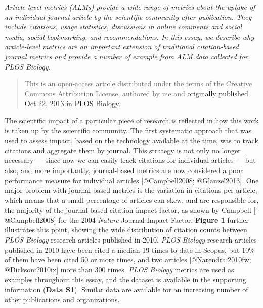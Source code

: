\emph{Article-level metrics (ALMs) provide a wide range of metrics about
the uptake of an individual journal article by the scientific community
after publication. They include citations, usage statistics, discussions
in online comments and social media, social bookmarking, and
recommendations. In this essay, we describe why article-level metrics
are an important extension of traditional citation-based journal metrics
and provide a number of example from ALM data collected for PLOS
Biology.}

\begin{quote}
This is an open-access article distributed under the terms of the
Creative Commons Attribution License, authored by me and
\href{http://dx.doi.org/10.1371/journal.pbio.1001687}{originally
published Oct 22, 2013 in PLOS Biology}.
\end{quote}

The scientific impact of a particular piece of research is reflected in
how this work is taken up by the scientific community. The first
systematic approach that was used to assess impact, based on the
technology available at the time, was to track citations and aggregate
them by journal. This strategy is not only no longer necessary --- since
now we can easily track citations for individual articles --- but also,
and more importantly, journal-based metrics are now considered a poor
performance measure for individual articles {[}@Campbell2008;
@Glanzel2013{]}. One major problem with journal-based metrics is the
variation in citations per article, which means that a small percentage
of articles can skew, and are responsible for, the majority of the
journal-based citation impact factor, as shown by Campbell
{[}-@Campbell2008{]} for the 2004 \emph{Nature} Journal Impact Factor.
\textbf{Figure 1} further illustrates this point, showing the wide
distribution of citation counts between \emph{PLOS Biology} research
articles published in 2010. \emph{PLOS Biology} research articles
published in 2010 have been cited a median 19 times to date in Scopus,
but 10\% of them have been cited 50 or more times, and two articles
{[}@Narendra:2010fw; @Dickson:2010ix{]} more than 300 times. \emph{PLOS
Biology} metrics are used as examples throughout this essay, and the
dataset is available in the supporting information (\textbf{Data S1}).
Similar data are available for an increasing number of other
publications and organizations.

